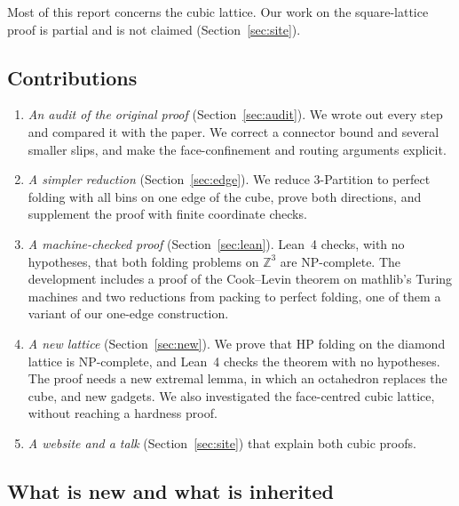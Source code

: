 \documentclass[11pt,letterpaper]{article}
\theoremstyle{definition}
\theoremstyle{remark}
\newcommand{\Z}{\mathbb{Z}}
\begin{document}
Most of this report concerns the cubic lattice. Our work on the square-lattice proof is partial and
is not claimed (Section~\ref{sec:site}).

\subsection{Contributions}

\begin{enumerate}[label=(\arabic*)]
  \item \emph{An audit of the original proof} (Section~\ref{sec:audit}). We wrote out every step and
    compared it with the paper. We correct a connector bound and several smaller slips, and make the
    face-confinement and routing arguments explicit.
  \item \emph{A simpler reduction} (Section~\ref{sec:edge}). We reduce 3-Partition to perfect folding
    with all bins on one edge of the cube, prove both directions, and supplement the proof with
    finite coordinate checks.
  \item \emph{A machine-checked proof} (Section~\ref{sec:lean}). Lean~4 checks, with no hypotheses,
    that both folding problems on $\Z^3$ are NP-complete. The development includes a proof of the
    Cook--Levin theorem on mathlib's Turing machines and two reductions from packing to perfect
    folding, one of them a variant of our one-edge construction.
  \item \emph{A new lattice} (Section~\ref{sec:new}). We prove that HP folding on the diamond lattice
    is NP-complete, and Lean~4 checks the theorem with no hypotheses. The proof needs a new extremal
    lemma, in which an octahedron replaces the cube, and new gadgets. We also investigated the
    face-centred cubic lattice, without reaching a hardness proof.
  \item \emph{A website and a talk} (Section~\ref{sec:site}) that explain both cubic proofs.
\end{enumerate}

\subsection{What is new and what is inherited}
\end{document}
